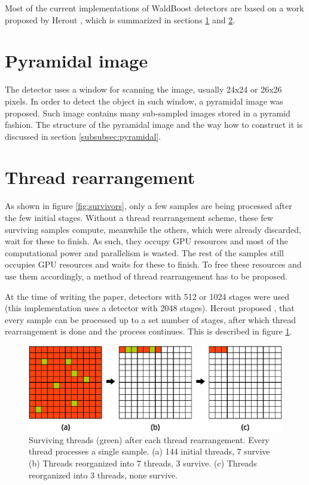 Most of the current implementations of WaldBoost detectors are based on a work proposed by Herout \cite{herout2011real}, which is summarized in sections \ref{subsec:anal-pyramidal} and \ref{subsec:anal-thread-rearrangement}. 

\section{Pyramidal image}\label{subsec:anal-pyramidal}

The detector uses a window for scanning the image, usually 24x24 or 26x26 pixels. In order to detect the object in such window, a pyramidal image was proposed. Such image contains many sub-sampled images stored in a pyramid fashion. The structure of the pyramidal image and the way how to construct it is discussed in section \ref{subsubsec:pyramidal}.

\section{Thread rearrangement}\label{subsec:anal-thread-rearrangement}

As shown in figure \ref{fig:survivors}, only a few samples are being processed after the few initial stages. Without a thread rearrangement scheme, these few surviving samples compute, meanwhile the others, which were already discarded, wait for these to finish. As such, they occupy GPU resources and most of the computational power and parallelism is wasted. The rest of the samples still occupies GPU resources and waits for these to finish. To free these resources and use them accordingly, a method of thread rearrangement has to be proposed.

At the time of writing the paper, detectors with 512 or 1024 stages were used (this implementation uses a detector with 2048 stages). Herout proposed \cite{herout2011real}, that every sample can be processed up to a set number of stages, after which thread rearrangement is done and the process continues. This is described in figure \ref{fig:thread-rearrangement}.

\begin{center}
\begin{figure}[ht]
	\centering\includegraphics[width=0.75\linewidth]{fig/thread-rearrangement.eps}
	\caption{Surviving threads (green) after each thread rearrangement. Every thread processes a single sample. (a) 144 initial threads, 7 survive (b) Threads reorganized into 7 threads, 3 survive. (c) Threads reorganized into 3 threads, none survive.}
	\label{fig:thread-rearrangement}
\end{figure}
\end{center}

